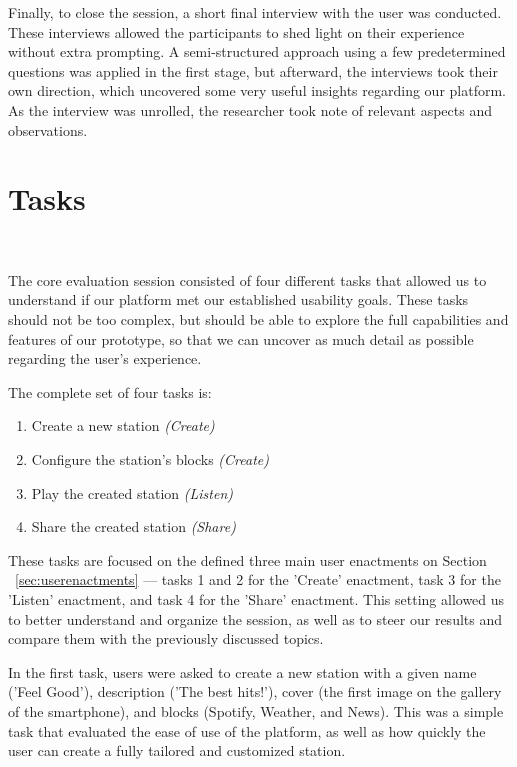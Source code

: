 Finally, to close the session, a short final interview with the user was conducted. These interviews allowed the participants to shed light on their experience without extra prompting. A semi-structured approach using a few predetermined questions was applied in the first stage, but afterward, the interviews took their own direction, which uncovered some very useful insights regarding our platform. As the interview was unrolled, the researcher took note of relevant aspects and observations.

\section{Tasks}
~\label{sub:tasks}

The core evaluation session consisted of four different tasks that allowed us to understand if our platform met our established usability goals. These tasks should not be too complex, but should be able to explore the full capabilities and features of our prototype, so that we can uncover as much detail as possible regarding the user's experience.

The complete set of four tasks is:

\begin{enumerate}
	\item Create a new station \textit{(Create)}
	\item Configure the station's blocks \textit{(Create)}
	\item Play the created station \textit{(Listen)}
	\item Share the created station \textit{(Share)}
\end{enumerate}

These tasks are focused on the defined three main user enactments on Section ~\ref{sec:userenactments} — tasks 1 and 2 for the 'Create' enactment, task 3 for the 'Listen' enactment, and task 4 for the 'Share' enactment. This setting allowed us to better understand and organize the session, as well as to steer our results and compare them with the previously discussed topics.

In the first task, users were asked to create a new station with a given name ('Feel Good'), description ('The best hits!'), cover (the first image on the gallery of the smartphone), and blocks (Spotify, Weather, and News). This was a simple task that evaluated the ease of use of the platform, as well as how quickly the user can create a fully tailored and customized station.

